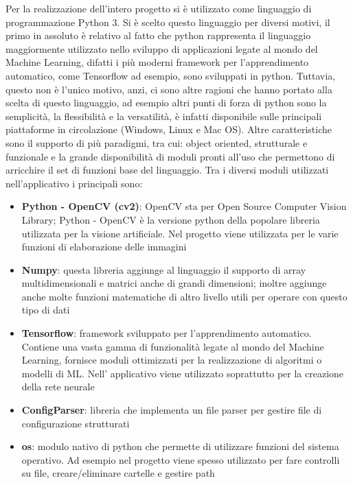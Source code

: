 Per la realizzazione dell’intero progetto si è utilizzato come linguaggio di programmazione Python 3. Si è scelto questo linguaggio per diversi motivi, il primo in assoluto è relativo al fatto che python rappresenta il linguaggio maggiormente utilizzato nello sviluppo di applicazioni legate al mondo del Machine Learning, difatti i più moderni framework per l’apprendimento automatico, come Tensorflow ad esempio, sono sviluppati in python. Tuttavia, questo non è l’unico motivo, anzi, ci sono altre ragioni che hanno portato alla scelta di questo linguaggio, ad esempio altri punti di forza di python sono la semplicità, la flessibilità e la versatilità, è infatti disponibile sulle principali piattaforme in circolazione (Windows, Linux e Mac OS). Altre caratteristiche sono il supporto di più paradigmi, tra cui: object oriented, strutturale e funzionale e la grande disponibilità di moduli pronti all’uso che permettono di arricchire il set di funzioni base del linguaggio. 
Tra i diversi moduli utilizzati nell’applicativo i principali sono:
\begin{itemize}
  \item \textbf{Python - OpenCV (cv2)}:  OpenCV sta per Open Source Computer Vision Library; Python - OpenCV è la versione python della popolare libreria utilizzata per la visione artificiale. Nel progetto viene utilizzata per le varie funzioni di elaborazione delle immagini
  \item \textbf{Numpy}: questa libreria aggiunge al linguaggio il supporto di array multidimensionali e matrici anche di grandi dimensioni; inoltre aggiunge anche molte funzioni matematiche di altro livello utili per operare con questo tipo di dati
  \item \textbf{Tensorflow}: framework sviluppato per l’apprendimento automatico. Contiene una vasta gamma di funzionalità legate al mondo del Machine Learning, fornisce moduli ottimizzati per la realizzazione di algoritmi o modelli di ML. Nell’ applicativo viene utilizzato soprattutto per la creazione della rete neurale
  \item \textbf{ConfigParser}: libreria che implementa un file parser per gestire file di configurazione strutturati
  \item \textbf{os}: modulo nativo di python che permette di utilizzare funzioni del sistema operativo. Ad esempio nel progetto viene spesso utilizzato per fare controlli su file, creare/eliminare cartelle e gestire path
\end{itemize}

